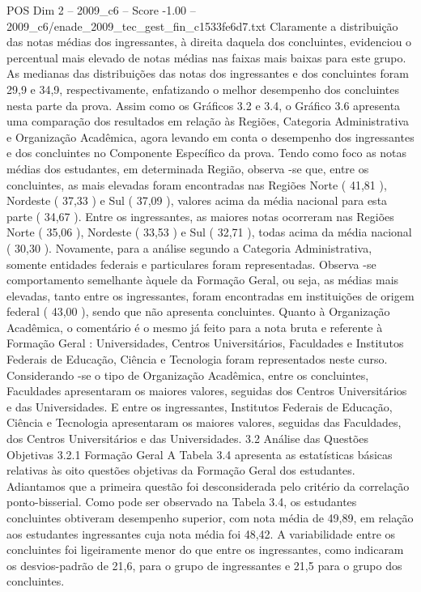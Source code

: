 \begin{textsample}{POS Dim 2 – 2009\_c6 – Score -1.00 – 2009\_c6/enade\_2009\_tec\_gest\_fin\_c1533fe6d7.txt}
Claramente a distribuição das notas médias dos ingressantes, à direita daquela dos concluintes, evidenciou o percentual mais elevado de notas médias nas faixas mais baixas para este grupo.
As medianas das distribuições das notas dos ingressantes e dos concluintes foram 29,9 e 34,9, respectivamente, enfatizando o melhor desempenho dos concluintes nesta parte da prova.
Assim como os Gráficos 3.2 e 3.4, o Gráfico 3.6 apresenta uma comparação dos resultados em relação às Regiões, Categoria Administrativa e Organização Acadêmica, agora levando em conta o desempenho dos ingressantes e dos concluintes no Componente Específico da prova.
Tendo como foco as notas médias dos estudantes, em determinada Região, observa -se que, entre os concluintes, as mais elevadas foram encontradas nas Regiões Norte ( 41,81 ), Nordeste ( 37,33 ) e Sul ( 37,09 ), valores acima da média nacional para esta parte ( 34,67 ).
Entre os ingressantes, as maiores notas ocorreram nas Regiões Norte ( 35,06 ), Nordeste ( 33,53 ) e Sul ( 32,71 ), todas acima da média nacional ( 30,30 ).
Novamente, para a análise segundo a Categoria Administrativa, somente entidades federais e particulares foram representadas.
Observa -se comportamento semelhante àquele da Formação Geral, ou seja, as médias mais elevadas, tanto entre os ingressantes, foram encontradas em instituições de origem federal ( 43,00 ), sendo que não apresenta concluintes.
Quanto à Organização Acadêmica, o comentário é o mesmo já feito para a nota bruta e referente à Formação Geral : Universidades, Centros Universitários, Faculdades e Institutos Federais de Educação, Ciência e Tecnologia foram representados neste curso.
Considerando -se o tipo de Organização Acadêmica, entre os concluintes, Faculdades apresentaram os maiores valores, seguidas dos Centros Universitários e das Universidades.
E entre os ingressantes, Institutos Federais de Educação, Ciência e Tecnologia apresentaram os maiores valores, seguidas das Faculdades, dos Centros Universitários e das Universidades. 3.2 Análise das Questões Objetivas 3.2.1 Formação Geral A Tabela 3.4 apresenta as estatísticas básicas relativas às oito questões objetivas da Formação Geral dos estudantes.
Adiantamos que a primeira questão foi desconsiderada pelo critério da correlação ponto-bisserial.
Como pode ser observado na Tabela 3.4, os estudantes concluintes obtiveram desempenho superior, com nota média de 49,89, em relação aos estudantes ingressantes cuja nota média foi 48,42.
A variabilidade entre os concluintes foi ligeiramente menor do que entre os ingressantes, como indicaram os desvios-padrão de 21,6, para o grupo de ingressantes e 21,5 para o grupo dos concluintes.

\end{textsample}

